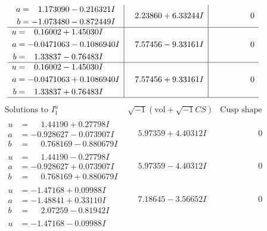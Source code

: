 \documentclass[1p]{elsarticle_modified}
\theoremstyle{definition}
\newcommand{\I}{\sqrt{-1}}
\begin{document}
$$\begin{array}{c|c|c}
\begin{aligned}
a &= \phantom{-}1.173090 - 0.216321 I \\
b &= -1.073480 - 0.872449 I\end{aligned}
 & \phantom{-}2.23860 + 6.33244 I & \phantom{-0.000000 } 0 \\ \hline\begin{aligned}
u &= \phantom{-}0.16002 + 1.45030 I \\
a &= -0.0471063 - 0.1086940 I \\
b &= \phantom{-}1.33837 - 0.76483 I\end{aligned}
 & \phantom{-}7.57456 - 9.33161 I & \phantom{-0.000000 } 0 \\ \hline\begin{aligned}
u &= \phantom{-}0.16002 - 1.45030 I \\
a &= -0.0471063 + 0.1086940 I \\
b &= \phantom{-}1.33837 + 0.76483 I\end{aligned}
 & \phantom{-}7.57456 + 9.33161 I & \phantom{-0.000000 } 0\\
 \hline 
 \end{array}$$\newpage$$\begin{array}{c|c|c}  
\text{Solutions to }I^u_{1}& \I (\text{vol} + \sqrt{-1}CS) & \text{Cusp shape}\\
 \hline 
\begin{aligned}
u &= \phantom{-}1.44190 + 0.27798 I \\
a &= -0.928627 - 0.073907 I \\
b &= \phantom{-}0.768169 - 0.880679 I\end{aligned}
 & \phantom{-}5.97359 + 4.40312 I & \phantom{-0.000000 } 0 \\ \hline\begin{aligned}
u &= \phantom{-}1.44190 - 0.27798 I \\
a &= -0.928627 + 0.073907 I \\
b &= \phantom{-}0.768169 + 0.880679 I\end{aligned}
 & \phantom{-}5.97359 - 4.40312 I & \phantom{-0.000000 } 0 \\ \hline\begin{aligned}
u &= -1.47168 + 0.09988 I \\
a &= -1.48841 + 0.33110 I \\
b &= \phantom{-}2.07259 - 0.81942 I\end{aligned}
 & \phantom{-}7.18645 - 3.56652 I & \phantom{-0.000000 } 0 \\ \hline\begin{aligned}
u &= -1.47168 - 0.09988 I \\

\end{aligned}
\end{array}$$
\end{document}
